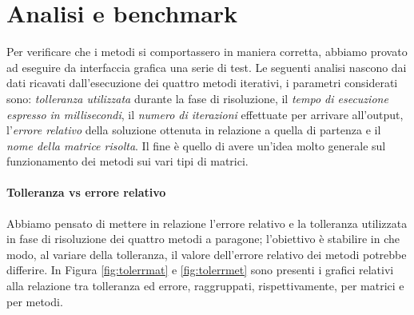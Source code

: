 \section{Analisi e benchmark}

Per verificare che i metodi si comportassero in maniera corretta, abbiamo provato ad eseguire da interfaccia grafica una serie di test.
Le seguenti analisi nascono dai dati ricavati dall'esecuzione dei quattro metodi iterativi, i parametri considerati sono: \textit{tolleranza utilizzata} durante la fase di risoluzione, il \textit{tempo di esecuzione espresso in millisecondi}, il \textit{numero di iterazioni} effettuate per arrivare all'output, l'\textit{errore relativo} della soluzione ottenuta in relazione a quella di partenza e il \textit{nome della matrice risolta}. Il fine è quello di avere un'idea molto generale sul funzionamento dei metodi sui vari tipi di matrici.

\paragraph{Tolleranza vs errore relativo}
Abbiamo pensato di mettere in relazione l'errore relativo e la tolleranza utilizzata in fase di risoluzione dei quattro metodi a paragone; l'obiettivo è stabilire in che modo, al variare della tolleranza, il valore dell'errore relativo dei metodi potrebbe differire. In Figura \ref{fig:tolerrmat} e \ref{fig:tolerrmet} sono presenti i grafici relativi alla relazione tra tolleranza ed errore, raggruppati, rispettivamente, per matrici e per metodi.



